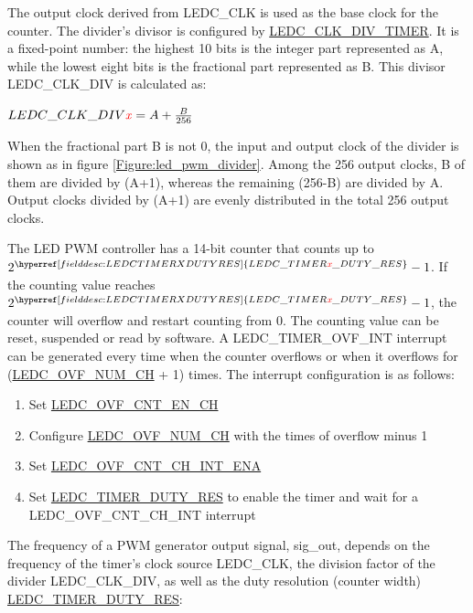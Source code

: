 \documentclass[main\_\_EN.tex]{subfiles}
\begin{document}
The output clock derived from LEDC\_CLK is used as the base clock for the counter. The divider's divisor is configured by \hyperref[fielddesc:LEDCCLKDIVTIMERX]{LEDC\_CLK\_DIV\_TIMER}. It is a fixed-point number: the highest 10 bits is the integer part represented as A, while the lowest eight bits is the fractional part represented as B. This divisor LEDC\_CLK\_DIV is calculated as:
\begin{center}
$LEDC\_CLK\_DIV\textcolor{red}{\it{x}} = A + \frac{B}{256}$
\end{center}

When the fractional part B is not 0, the input and output clock of the divider is shown as in figure \ref{Figure:led_pwm_divider}. Among the 256 output clocks, B of them are divided by (A+1), whereas the remaining (256-B) are divided by A. Output clocks divided by (A+1) are evenly distributed in the total 256 output clocks.

The LED PWM controller has a 14-bit counter that counts up to $2^{\hyperref[fielddesc:LEDCTIMERXDUTYRES]{LEDC\_TIMER\regindex{x}\_DUTY\_RES}}-1$. If the counting value reaches $2^{\hyperref[fielddesc:LEDCTIMERXDUTYRES]{LEDC\_TIMER\regindex{x}\_DUTY\_RES}}-1$, the counter will overflow and restart counting from 0. The counting value can be reset, suspended or read by software. A LEDC\_TIMER\_OVF\_INT interrupt can be generated every time when the counter overflows or when it overflows for (\hyperref[fielddesc:LEDCOVFNUMCHN]{LEDC\_OVF\_NUM\_CH} + 1) times. The interrupt configuration is as follows:

 \begin{enumerate}
    \item Set \hyperref[fielddesc:LEDCOVFCNTENCHN]{LEDC\_OVF\_CNT\_EN\_CH}
    \item Configure \hyperref[fielddesc:LEDCOVFNUMCHN]{LEDC\_OVF\_NUM\_CH} with the times of overflow minus 1
    \item Set \hyperref[fielddesc:LEDCOVFCNTCHNINTENA]{LEDC\_OVF\_CNT\_CH\_INT\_ENA}
    \item Set \hyperref[fielddesc:LEDCTIMERXDUTYRES]{LEDC\_TIMER\_DUTY\_RES} to enable the timer and
    wait for a LEDC\_OVF\_CNT\_CH\_INT interrupt
\end{enumerate}

The frequency of a PWM generator output signal, sig\_out, depends on the frequency of the timer’s clock source LEDC\_CLK, the division factor of the divider LEDC\_CLK\_DIV, as well as the duty resolution (counter width) \hyperref[fielddesc:LEDCTIMERXDUTYRES]{LEDC\_TIMER\_DUTY\_RES}:
\end{document}
